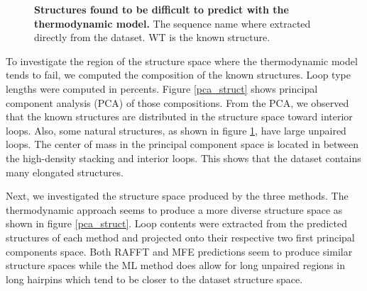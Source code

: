 \documentclass[a4paper,12pt]{article}
\begin{document}
{{\begin{figure}[!ht]
  \caption{\textbf{Structures found to be difficult to predict with the
      thermodynamic model.} The sequence name where extracted directly from the
    dataset. WT is the known structure.\label{diff_struct}}
\end{figure}

To investigate the region of the structure space where the thermodynamic model
tends to fail, we computed the composition of the known structures. Loop type
lengths were computed in percents. Figure \ref{pca_struct} shows principal
component analysis (PCA) of those compositions. From the PCA, we observed that
the known structures are distributed in the structure space toward interior
loops. Also, some natural structures, as shown in figure \ref{diff_struct}, have
large unpaired loops. The center of mass in the principal component space is
located in between the high-density stacking and interior loops. This shows that
the dataset contains many elongated structures.

Next, we investigated the structure space produced by the three methods. The
thermodynamic approach seems to produce a more diverse structure space as shown
in figure \ref{pca_struct}. Loop contents were extracted from the predicted
structures of each method and projected onto their respective two first
principal components space. Both RAFFT and MFE predictions seem to produce
similar structure spaces while the ML method does allow for long unpaired
regions in long hairpins which tend to be closer to the dataset structure space.

}}
\end{document}
